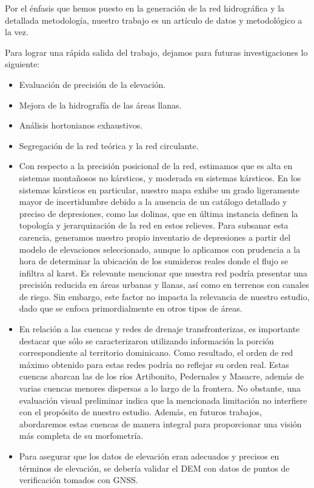 \documentclass[spanish]{article}
\providecommand{\tightlist}{%
  \setlength{\itemsep}{0pt}\setlength{\parskip}{0pt}}
\begin{document}
Por el énfasis que hemos puesto en la generación de la red hidrográfica
y la detallada metodología, nuestro trabajo es un artículo de datos y
metodológico a la vez.

Para lograr una rápida salida del trabajo, dejamos para futuras
investigaciones lo siguiente:

\begin{itemize}
\tightlist
\item
  Evaluación de precisión de la elevación.
\item
  Mejora de la hidrografía de las áreas llanas.
\item
  Análisis hortonianos exhaustivos.
\item
  Segregación de la red teórica y la red circulante.
\item
  Con respecto a la precisión posicional de la red, estimamos que es
  alta en sistemas montañosos no kársticos, y moderada en sistemas
  kársticos. En los sistemas kársticos en particular, nuestro mapa
  exhibe un grado ligeramente mayor de incertidumbre debido a la
  ausencia de un catálogo detallado y preciso de depresiones, como las
  dolinas, que en última instancia definen la topología y jerarquización
  de la red en estos relieves. Para subsanar esta carencia, generamos
  nuestro propio inventario de depresiones a partir del modelo de
  elevaciones seleccionado, aunque lo aplicamos con prudencia a la hora
  de determinar la ubicación de los sumideros reales donde el flujo se
  infiltra al karst. Es relevante mencionar que nuestra red podría
  presentar una precisión reducida en áreas urbanas y llanas, así como
  en terrenos con canales de riego. Sin embargo, este factor no impacta
  la relevancia de nuestro estudio, dado que se enfoca primordialmente
  en otros tipos de áreas.
\item
  En relación a las cuencas y redes de drenaje transfronterizas, es
  importante destacar que sólo se caracterizaron utilizando información
  la porción correspondiente al territorio dominicano. Como resultado,
  el orden de red máximo obtenido para estas redes podría no reflejar su
  orden real. Estas cuencas abarcan las de los ríos Artibonito,
  Pedernales y Masacre, además de varias cuencas menores dispersas a lo
  largo de la frontera. No obstante, una evaluación visual preliminar
  indica que la mencionada limitación no interfiere con el propósito de
  nuestro estudio. Además, en futuros trabajos, abordaremos estas
  cuencas de manera integral para proporcionar una visión más completa
  de su morfometría.
\item
  Para asegurar que los datos de elevación eran adecuados y precisos en
  términos de elevación, se debería validar el DEM con datos de puntos
  de verificación tomados con GNSS.
\end{itemize}
\end{document}
